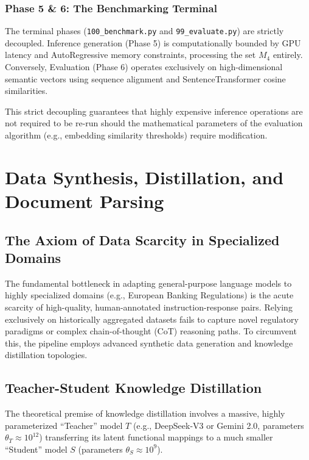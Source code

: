 \documentclass[12pt,a4paper]{report}
\begin{document}
\subsection{Phase 5 & 6: The Benchmarking Terminal}
The terminal phases (\texttt{100_benchmark.py} and \texttt{99_evaluate.py}) are strictly decoupled. Inference generation (Phase 5) is computationally bounded by GPU latency and AutoRegressive memory constraints, processing the set $M_4$ entirely. Conversely, Evaluation (Phase 6) operates exclusively on high-dimensional semantic vectors using sequence alignment and SentenceTransformer cosine similarities. 

This strict decoupling guarantees that highly expensive inference operations are not required to be re-run should the mathematical parameters of the evaluation algorithm (e.g., embedding similarity thresholds) require modification.

\chapter{Data Synthesis, Distillation, and Document Parsing}
\label{chap:data_synthesis}

\section{The Axiom of Data Scarcity in Specialized Domains}

The fundamental bottleneck in adapting general-purpose language models to highly specialized domains (e.g., European Banking Regulations) is the acute scarcity of high-quality, human-annotated instruction-response pairs. Relying exclusively on historically aggregated datasets fails to capture novel regulatory paradigms or complex chain-of-thought (CoT) reasoning paths. To circumvent this, the pipeline employs advanced synthetic data generation and knowledge distillation topologies.

\section{Teacher-Student Knowledge Distillation}

The theoretical premise of knowledge distillation involves a massive, highly parameterized ``Teacher'' model $T$ (e.g., DeepSeek-V3 or Gemini 2.0, parameters $\theta_T \approx 10^{12}$) transferring its latent functional mappings to a much smaller ``Student'' model $S$ (parameters $\theta_S \approx 10^9$).
\end{document}

